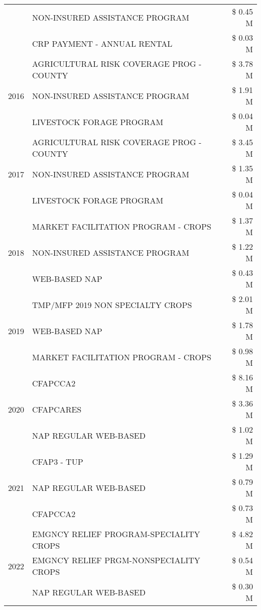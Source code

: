\begin{tabular}{llr}
 & NON-INSURED ASSISTANCE PROGRAM & \$ 0.45 M \\
 & CRP PAYMENT - ANNUAL RENTAL & \$ 0.03 M \\
\cline{1-3}
\multirow[t]{3}{*}{2016} & AGRICULTURAL RISK COVERAGE PROG - COUNTY & \$ 3.78 M \\
 & NON-INSURED ASSISTANCE PROGRAM & \$ 1.91 M \\
 & LIVESTOCK FORAGE PROGRAM & \$ 0.04 M \\
\cline{1-3}
\multirow[t]{3}{*}{2017} & AGRICULTURAL RISK COVERAGE PROG - COUNTY & \$ 3.45 M \\
 & NON-INSURED ASSISTANCE PROGRAM & \$ 1.35 M \\
 & LIVESTOCK FORAGE PROGRAM & \$ 0.04 M \\
\cline{1-3}
\multirow[t]{3}{*}{2018} & MARKET FACILITATION PROGRAM - CROPS & \$ 1.37 M \\
 & NON-INSURED ASSISTANCE PROGRAM & \$ 1.22 M \\
 & WEB-BASED NAP & \$ 0.43 M \\
\cline{1-3}
\multirow[t]{3}{*}{2019} & TMP/MFP 2019 NON SPECIALTY CROPS & \$ 2.01 M \\
 & WEB-BASED NAP & \$ 1.78 M \\
 & MARKET FACILITATION PROGRAM - CROPS & \$ 0.98 M \\
\cline{1-3}
\multirow[t]{3}{*}{2020} & CFAPCCA2 & \$ 8.16 M \\
 & CFAPCARES & \$ 3.36 M \\
 & NAP REGULAR WEB-BASED & \$ 1.02 M \\
\cline{1-3}
\multirow[t]{3}{*}{2021} & CFAP3 - TUP & \$ 1.29 M \\
 & NAP REGULAR WEB-BASED & \$ 0.79 M \\
 & CFAPCCA2 & \$ 0.73 M \\
\cline{1-3}
\multirow[t]{3}{*}{2022} & EMGNCY RELIEF PROGRAM-SPECIALITY CROPS & \$ 4.82 M \\
 & EMGNCY RELIEF PRGM-NONSPECIALITY CROPS & \$ 0.54 M \\
 & NAP REGULAR WEB-BASED & \$ 0.30 M \\
\cline{1-3}
\bottomrule
\end{tabular}
